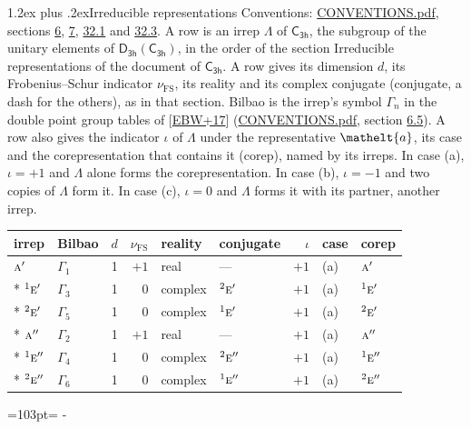 \documentclass[10pt,a4paper]{article}
\makeatletter
\renewcommand\section{\@startsection{section}{1}{\z@}{-3ex plus -1ex minus -.2ex}%
  {1.2ex plus .2ex}{\normalfont\large\sffamily\bfseries\color{parttitle}}}
\newcommand{\needspace}[1]{\par\penalty-100\begingroup\dimen0=#1\relax\dimen2=\pagegoal
  \advance\dimen2-\pagetotal\ifdim\dimen0>\dimen2\relax\ifdim\dimen2>0pt\vfil\break\fi\fi
  \endgroup}
\numberwithin{equation}{section}
\newcommand{\eltfont}[1]{{\let\sigma\eltsigma\mathelt{#1}}}
\newcommand{\grp}[1]{\mathsf{#1}}
\newcommand{\irr}[1]{\text{\normalfont\scshape #1}}
\newcommand{\conjpair}[1]{{}^{#1}}
\newcommand{\elt}[1]{\eltfont{#1}}
\newcommand{\fsind}{\nu_{\mathrm{FS}}}
\makeatother
\begin{document}
\section{Irreducible representations}\label{s:irreps}
Conventions: \href{../../CONVENTIONS.pdf}{CONVENTIONS.pdf}, sections \href{../../../rotation/CONVENTIONS.pdf\#conv.6}{6}, \href{../../../rotation/CONVENTIONS.pdf\#conv.7}{7}, \href{../../CONVENTIONS.pdf\#conv.32.1}{32.1} and \href{../../CONVENTIONS.pdf\#conv.32.3}{32.3}.
\leavevmode\label{n:irrep.Delta}A row is an irrep $\Lambda$ of $\grp{C_{3h}}$, the subgroup of the unitary elements of $\grp{D_{3h}}(\grp{C_{3h}})$, in the order of the section Irreducible representations of the document of \href{../../../rotation/data/pdf/C3h.pdf}{$\grp{C_{3h}}$}. \label{n:index.dimension}\label{n:index.frobenius}\label{n:head.irrep}\label{n:head.reality}\label{n:head.conjugate}A row gives its dimension $d$, its Frobenius--Schur indicator $\fsind$, its reality and its complex conjugate (conjugate, a dash for the others), as in that section. \label{n:head.bilbao}\label{n:irrep.alias.gamma}Bilbao is the irrep's symbol $\Gamma_n$ in the double point group tables of [\href{../../../REFERENCES.pdf\#ref.EBW+17}{EBW+17}] (\href{../../CONVENTIONS.pdf}{CONVENTIONS.pdf}, section \href{../../../rotation/CONVENTIONS.pdf\#conv.6.5}{6.5}). \label{n:head.case.corep}\label{n:head.corep}A row also gives the indicator $\iota$ of $\Lambda$ under the representative $\elt{a}$, its case and the corepresentation that contains it (corep), named by its irreps. In case (a), $\iota = +1$ and $\Lambda$ alone forms the corepresentation. In case (b), $\iota = -1$ and two copies of $\Lambda$ form it. In case (c), $\iota = 0$ and $\Lambda$ forms it with its partner, another irrep.
\setlength{\emergencystretch}{2em}\par\setlength{\emergencystretch}{0pt}
{\small\renewcommand{\arraystretch}{1.25}\setlength{\tabcolsep}{4pt}\begin{longtable}{@{}llrrllrll@{}}\toprule
irrep & Bilbao & $d$ & $\fsind$ & reality & conjugate & $\iota$ & case & corep\\\midrule\endhead
\bottomrule\endfoot\endlastfoot
$\irr{a}'$ & $\Gamma_{1}$ & 1 & $+1$ & real & --- & $+1$ & (a) & $\irr{a}'$\\*
$\conjpair{1}\irr{e}'$ & $\Gamma_{3}$ & 1 & $0$ & complex & $\conjpair{2}\irr{e}'$ & $+1$ & (a) & $\conjpair{1}\irr{e}'$\\*
$\conjpair{2}\irr{e}'$ & $\Gamma_{5}$ & 1 & $0$ & complex & $\conjpair{1}\irr{e}'$ & $+1$ & (a) & $\conjpair{2}\irr{e}'$\\*
$\irr{a}''$ & $\Gamma_{2}$ & 1 & $+1$ & real & --- & $+1$ & (a) & $\irr{a}''$\\*
$\conjpair{1}\irr{e}''$ & $\Gamma_{4}$ & 1 & $0$ & complex & $\conjpair{2}\irr{e}''$ & $+1$ & (a) & $\conjpair{1}\irr{e}''$\\*
$\conjpair{2}\irr{e}''$ & $\Gamma_{6}$ & 1 & $0$ & complex & $\conjpair{1}\irr{e}''$ & $+1$ & (a) & $\conjpair{2}\irr{e}''$\\
\bottomrule\end{longtable}}
\needspace{103pt}
\end{document}
